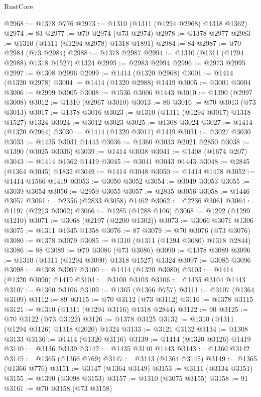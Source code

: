 \begin{lexlean}{RustCore}
\begin{coremodule}
@2968 := @1378 @776
@2973 := @1310 (@1311 (@1294 @2968) @1318 @1362)
@2974 := 83
@2977 := @70 @2974 (@73 @2974)
@2978 := @1378 @2977
@2983 := @1310 (@1311 (@1294 @2978) @1318 @1891)
@2984 := 84
@2987 := @70 @2984 (@73 @2984)
@2988 := @1378 @2987
@2994 := @1310 (@1311 (@1294 @2988) @1318 @1527) @1324
@2995 := @2983 @2994
@2996 := @2973 @2995
@2997 := @1308 @2996
@2999 := @1414 (@1320 @2968)
@3001 := @1414 (@1320 @2978)
@3004 := @1414 (@1320 @2988) @1419
@3005 := @3001 @3004
@3006 := @2999 @3005
@3008 := @1536 @3006 @1443
@3010 := @1390 (@2997 @3008)
@3012 := @1310 (@2967 @3010)
@3013 := 86
@3016 := @70 @3013 (@73 @3013)
@3017 := @1378 @3016
@3023 := @1310 (@1311 (@1294 @3017) @1318 @1527) @1324
@3024 := @3012 @3023
@3025 := @1308 @3024
@3027 := @1414 (@1320 @2964)
@3030 := @1414 (@1320 @3017) @1419
@3031 := @3027 @3030
@3033 := @1435 @3031 @1443
@3036 := @1360 @3033 @2021 @2850
@3038 := @1390 (@3025 @3036)
@3039 := @1414 @3038
@3041 := @1408 (@1674 @207)
@3043 := @1414 @1362 @1419
@3045 := @3041 @3043 @1443
@3048 := @2845 (@1364 @3045) @1832
@3049 := @1414 @3048
@3050 := @1414 @1478
@3052 := @1414 @1566 @1419
@3053 := @3050 @3052
@3054 := @3049 @3053
@3055 := @3039 @3054
@3056 := @2959 @3055
@3057 := @2835 @3056
@3058 := @1446 @3057
@3061 := @2356 (@2833 @3058) @1462
@3062 := @2236 @3061
@3064 := @1197 (@2213 @3062)
@3066 := @1285 (@1288 @106)
@3068 := @1292 (@1299 @1210)
@3071 := @3068 (@2197 (@2200 @1302))
@3073 := @3066 @3071 @1306
@3075 := @1311 @1345 @1358
@3076 := 87
@3079 := @70 @3076 (@73 @3076)
@3080 := @1378 @3079
@3085 := @1310 (@1311 (@1294 @3080) @1318 @2844)
@3086 := 88
@3089 := @70 @3086 (@73 @3086)
@3090 := @1378 @3089
@3096 := @1310 (@1311 (@1294 @3090) @1318 @1527) @1324
@3097 := @3085 @3096
@3098 := @1308 @3097
@3100 := @1414 (@1320 @3080)
@3103 := @1414 (@1320 @3090) @1419
@3104 := @3100 @3103
@3106 := @1435 @3104 @1443
@3107 := @1360 @3106
@3109 := @1365 (@1366 @757)
@3111 := @3107 (@1364 @3109)
@3112 := 89
@3115 := @70 @3112 (@73 @3112)
@3116 := @1378 @3115
@3121 := @1310 (@1311 (@1294 @3116) @1318 @2844)
@3122 := 90
@3125 := @70 @3122 (@73 @3122)
@3126 := @1378 @3125
@3132 := @1310 (@1311 (@1294 @3126) @1318 @2020) @1324
@3133 := @3121 @3132
@3134 := @1308 @3133
@3136 := @1414 (@1320 @3116)
@3139 := @1414 (@1320 @3126) @1419
@3140 := @3136 @3139
@3142 := @1435 @3140 @1443
@3143 := @1360 @3142
@3145 := @1365 (@1366 @769)
@3147 := @3143 (@1364 @3145)
@3149 := @1365 (@1366 @776)
@3151 := @3147 (@1364 @3149)
@3153 := @3111 (@3134 @3151)
@3155 := @1390 (@3098 @3153)
@3157 := @1310 (@3075 @3155)
@3158 := 91
@3161 := @70 @3158 (@73 @3158)

\end{coremodule}
\end{lexlean}
